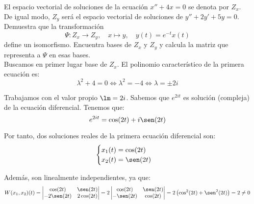 \documentclass[12pt]{article}
\begin{document}
    \begin{ejercicio}
        El espacio vectorial de soluciones de la ecuación $x'' + 4x = 0$ se denota por $Z_x$. De igual modo, $Z_y$ será el espacio vectorial de soluciones de $y'' + 2y' + 5y = 0$. Demuestra que la transformación
        \begin{equation*}
            \Psi: Z_x \to Z_y, \quad x \mapsto y, \quad y(t) = e^{-t}x(t)
        \end{equation*}
        define un isomorfismo. Encuentra bases de $Z_x$ y $Z_y$ y calcula la matriz que representa a $\Psi$ en esas bases.\\

        Buscamos en primer lugar base de $Z_x$. El polinomio característico de la primera ecuación es:
        \begin{equation*}
            \lambda^2+4=0\Longleftrightarrow
            \lambda^2=-4\Longleftrightarrow
            \lambda=\pm 2i
        \end{equation*}

        Trabajamos con el valor propio $\lm=2i$. Sabemos que $e^{2it}$ es solución (compleja) de la ecuación diferencial.
        Tenemos que:
        \begin{equation*}
            e^{2it}=\cos(2t)+i\sen(2t)
        \end{equation*}

        Por tanto, dos soluciones reales de la primera ecuación diferencial son:
        \begin{equation*}
            \begin{cases}
                x_1(t)=\cos(2t)\\
                x_2(t)=\sen(2t)
            \end{cases}
        \end{equation*}

        Además, son linealmente independientes, ya que:
        \begin{equation*}
            W(x_1,x_2)(t)=\begin{vmatrix}
                \cos(2t) & \sen(2t)\\
                -2\sen(2t) & 2\cos(2t)
            \end{vmatrix}=2\begin{vmatrix}
                \cos(2t) & \sen(2t)\\
                -\sen(2t) & \cos(2t)
            \end{vmatrix}=2\left(\cos^2(2t)+\sen^2(2t)\right)=2\neq 0
        \end{equation*}


\end{ejercicio}
\end{document}
